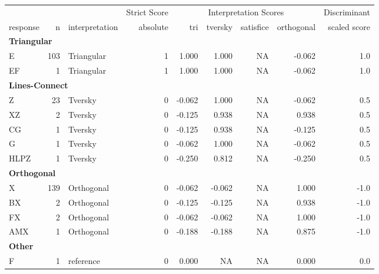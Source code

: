 \documentclass[
  letterpaper,
  DIV=11,
  numbers=noendperiod]{scrreprt}
\begin{document}
\begin{tabular}[t]{l|r|l|r|r|r|r|r|r}
\hline
\multicolumn{3}{c|}{ } & \multicolumn{1}{c|}{Strict Score} & \multicolumn{4}{c|}{Interpretation Scores} & \multicolumn{1}{c}{Discriminant} \\
\cline{4-4} \cline{5-8} \cline{9-9}
response & n & interpretation & absolute & tri & tversky & satisfice & orthogonal & scaled score\\
\hline
\multicolumn{9}{l}{\textbf{Triangular}}\\
\hline
\hspace{1em}E & 103 & Triangular & 1 & 1.000 & 1.000 & NA & -0.062 & 1.0\\
\hline
\hspace{1em}EF & 1 & Triangular & 1 & 1.000 & 1.000 & NA & -0.062 & 1.0\\
\hline
\multicolumn{9}{l}{\textbf{Lines-Connect}}\\
\hline
\hspace{1em}Z & 23 & Tversky & 0 & -0.062 & 1.000 & NA & -0.062 & 0.5\\
\hline
\hspace{1em}XZ & 2 & Tversky & 0 & -0.125 & 0.938 & NA & 0.938 & 0.5\\
\hline
\hspace{1em}CG & 1 & Tversky & 0 & -0.125 & 0.938 & NA & -0.125 & 0.5\\
\hline
\hspace{1em}G & 1 & Tversky & 0 & -0.062 & 1.000 & NA & -0.062 & 0.5\\
\hline
\hspace{1em}HLPZ & 1 & Tversky & 0 & -0.250 & 0.812 & NA & -0.250 & 0.5\\
\hline
\multicolumn{9}{l}{\textbf{Orthogonal}}\\
\hline
\hspace{1em}X & 139 & Orthogonal & 0 & -0.062 & -0.062 & NA & 1.000 & -1.0\\
\hline
\hspace{1em}BX & 2 & Orthogonal & 0 & -0.125 & -0.125 & NA & 0.938 & -1.0\\
\hline
\hspace{1em}FX & 2 & Orthogonal & 0 & -0.062 & -0.062 & NA & 1.000 & -1.0\\
\hline
\hspace{1em}AMX & 1 & Orthogonal & 0 & -0.188 & -0.188 & NA & 0.875 & -1.0\\
\hline
\multicolumn{9}{l}{\textbf{Other}}\\
\hline
\hspace{1em}F & 1 & reference & 0 & 0.000 & NA & NA & 0.000 & 0.0\\

\end{tabular}
\end{document}
